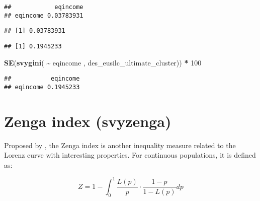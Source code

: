 \documentclass[
]{book}
\newenvironment{Shaded}{\begin{snugshade}}{\end{snugshade}}
\newcommand{\CommentTok}[1]{\textcolor[rgb]{0.56,0.35,0.01}{\textit{#1}}}
\newcommand{\DecValTok}[1]{\textcolor[rgb]{0.00,0.00,0.81}{#1}}
\newcommand{\FunctionTok}[1]{\textcolor[rgb]{0.13,0.29,0.53}{\textbf{#1}}}
\newcommand{\NormalTok}[1]{#1}
\newcommand{\SpecialCharTok}[1]{\textcolor[rgb]{0.81,0.36,0.00}{\textbf{#1}}}
\begin{document}
\begin{verbatim}
##            eqincome
## eqincome 0.03783931
\end{verbatim}

\begin{Shaded}
\end{Shaded}

\begin{verbatim}
## [1] 0.03783931
\end{verbatim}

\begin{Shaded}
\end{Shaded}

\begin{verbatim}
## [1] 0.1945233
\end{verbatim}

\begin{Shaded}
\begin{Highlighting}[]
\FunctionTok{SE}\NormalTok{(}\FunctionTok{svygini}\NormalTok{( }\SpecialCharTok{\textasciitilde{}}\NormalTok{ eqincome , des\_eusilc\_ultimate\_cluster)) }\SpecialCharTok{*} \DecValTok{100}
\end{Highlighting}
\end{Shaded}

\begin{verbatim}
##           eqincome
## eqincome 0.1945233
\end{verbatim}

\hypertarget{zenga-index-svyzenga}{%
\section{Zenga index (svyzenga)}\label{zenga-index-svyzenga}}

Proposed by \textcite{zenga2007}, the Zenga index is another inequality measure related to the Lorenz curve with interesting properties. For continuous populations, it is defined as:

\[
Z = 1 - \int_{0}^{1} \frac{L(p)}{p} \cdot \frac{ 1 - p }{ 1 - L(p) } dp 
\]
\end{document}
